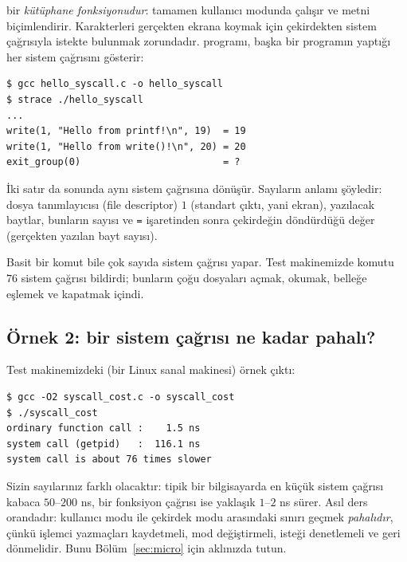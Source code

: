 

 bir \emph{kütüphane fonksiyonudur}: tamamen kullanıcı modunda çalışır ve metni biçimlendirir. Karakterleri gerçekten ekrana koymak için çekirdekten  sistem çağrısıyla istekte bulunmak zorundadır.  programı, başka bir programın yaptığı her sistem çağrısını gösterir:

\begin{lstlisting}[style=term]
$ gcc hello_syscall.c -o hello_syscall
$ strace ./hello_syscall
...
write(1, "Hello from printf!\n", 19)  = 19
write(1, "Hello from write()!\n", 20) = 20
exit_group(0)                         = ?
\end{lstlisting}

İki satır da sonunda aynı  sistem çağrısına dönüşür. Sayıların anlamı şöyledir: dosya tanımlayıcısı (file descriptor) $1$ (standart çıktı, yani ekran), yazılacak baytlar, bunların sayısı ve \texttt{=} işaretinden sonra çekirdeğin döndürdüğü değer (gerçekten yazılan bayt sayısı).

Basit bir komut bile çok sayıda sistem çağrısı yapar. Test makinemizde  komutu $76$ sistem çağrısı bildirdi; bunların çoğu dosyaları açmak, okumak, belleğe eşlemek ve kapatmak içindi.

\subsection{Örnek 2: bir sistem çağrısı ne kadar pahalı?}



Test makinemizdeki (bir Linux sanal makinesi) örnek çıktı:

\begin{lstlisting}[style=term]
$ gcc -O2 syscall_cost.c -o syscall_cost
$ ./syscall_cost
ordinary function call :    1.5 ns
system call (getpid)   :  116.1 ns
system call is about 76 times slower
\end{lstlisting}

Sizin sayılarınız farklı olacaktır: tipik bir bilgisayarda en küçük sistem çağrısı kabaca $50$--$200$ ns, bir fonksiyon çağrısı ise yaklaşık $1$--$2$ ns sürer. Asıl ders orandadır: kullanıcı modu ile çekirdek modu arasındaki sınırı geçmek \emph{pahalıdır}, çünkü işlemci yazmaçları kaydetmeli, mod değiştirmeli, isteği denetlemeli ve geri dönmelidir. Bunu Bölüm~\ref{sec:micro} için aklınızda tutun.

